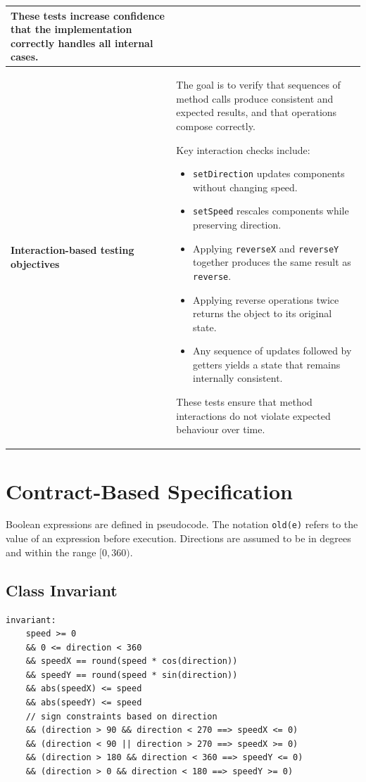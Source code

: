 \begin{longtable}{|p{4cm}|p{11cm}|}
These tests increase confidence that the implementation correctly handles all internal cases. \\
\hline

\textbf{Interaction-based testing objectives} &
The goal is to verify that sequences of method calls produce consistent and expected results, and that operations compose correctly.

Key interaction checks include:
\begin{itemize}
\item \texttt{setDirection} updates components without changing speed.
\item \texttt{setSpeed} rescales components while preserving direction.
\item Applying \texttt{reverseX} and \texttt{reverseY} together produces 
the same result as \texttt{reverse}.
\item Applying reverse operations twice returns the object to its original 
state.
\item Any sequence of updates followed by getters yields a state that 
remains internally consistent.
\end{itemize}

These tests ensure that method interactions do not violate expected 
behaviour over time. \\
\hline

\end{longtable}

\section{Contract-Based Specification}

Boolean expressions are defined in pseudocode. 
The notation \texttt{old(e)} refers to the value of an expression 
before execution. Directions are assumed to be in degrees and within 
the range $[0, 360)$.

\subsection*{Class Invariant}

\begin{verbatim}
invariant:
    speed >= 0
    && 0 <= direction < 360
    && speedX == round(speed * cos(direction))
    && speedY == round(speed * sin(direction))
    && abs(speedX) <= speed
    && abs(speedY) <= speed
    // sign constraints based on direction
    && (direction > 90 && direction < 270 ==> speedX <= 0)
    && (direction < 90 || direction > 270 ==> speedX >= 0)
    && (direction > 180 && direction < 360 ==> speedY <= 0)
    && (direction > 0 && direction < 180 ==> speedY >= 0)
\end{verbatim}

